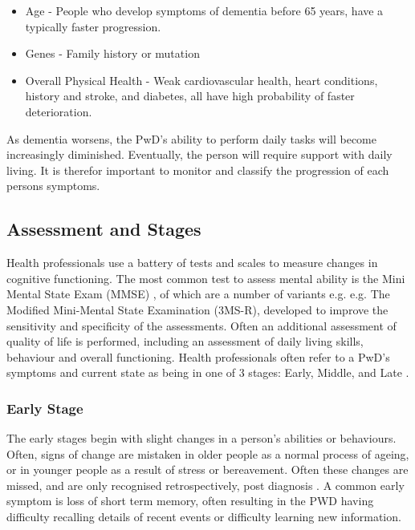 \begin{itemize}[noitemsep,topsep=0pt]
\item Age - People who develop symptoms of dementia before 65 years, have a typically faster progression.
\item Genes - Family history or mutation
\item Overall Physical Health - Weak cardiovascular health, heart conditions, history and stroke, and diabetes, all have high probability of faster deterioration.
\end{itemize}

As dementia worsens, the PwD's ability to perform daily tasks will become increasingly diminished. Eventually, the person will require support with daily living. It is therefor important to monitor and classify the progression of each persons symptoms.

\subsection{Assessment and Stages}
Health professionals use a battery of tests and scales to measure changes in cognitive functioning. The most common test to assess mental ability is the Mini Mental State Exam (MMSE) \cite{Folstein1975}, of which are a number of variants e.g. e.g. The Modified Mini-Mental State Examination (3MS-R)\cite{Tschanz2002}, developed to improve the sensitivity and specificity of the assessments. Often an additional assessment of quality of life is performed, including an assessment of daily living skills, behaviour and overall functioning. Health professionals often refer to a PwD's symptoms and current state as being in one of 3 stages: Early, Middle, and Late \cite{2015AlzheimersDiseaseFactsFigures, AlzheimersAssociation2015a, Grout2015}.

\subsubsection{Early Stage}
The early stages begin with slight changes in a person's abilities or behaviours. Often, signs of change are mistaken in older people as a normal process of ageing, or in younger people as a result of stress or bereavement. Often these changes are missed, and are only recognised retrospectively, post diagnosis \cite{Grout2015}. A common early symptom is loss of short term memory, often resulting in the PWD having difficulty recalling details of recent events or difficulty learning new information.


